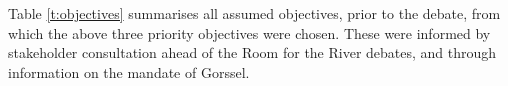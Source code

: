     
Table \ref{t:objectives} summarises all assumed objectives, prior to the debate, from which the above three priority objectives were chosen. These were informed by stakeholder consultation ahead of the Room for the River debates, and through information on the mandate of Gorssel.

